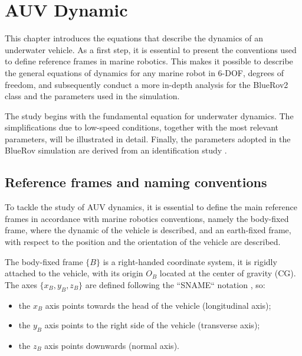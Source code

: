 \chapter{AUV Dynamic}
\label{chap:second}
\ifpdf
    \graphicspath{{Chapter2/Figures/PNG/}{Chapter2/Figures/PDF/}{Chapter2/Figures/}{Chapter2/Figures/EPS/}}
\else
    \graphicspath{{Chapter2/Figures/EPS/}{Chapter2/Figures/}}
\fi
This chapter introduces the equations that describe the dynamics of an underwater vehicle. As a first step, it is essential to present 
the conventions used to define reference frames in marine robotics. This makes it possible to describe the general equations of dynamics 
\cite{fossenHandbookMarineCraft2011} for any marine robot in 6-DOF, degrees of freedom, and subsequently conduct a more in-depth analysis 
for the BlueRov2 class and the parameters used in the simulation.

The study begins with the fundamental equation for underwater dynamics. The simplifications due to low-speed conditions, together with the most relevant 
parameters, will be illustrated in detail.
Finally, the parameters adopted in the BlueRov simulation are derived from an identification study \cite{bergDevelopmentCommissioningDP2012}.

\section{Reference frames and naming conventions}
To tackle the study of AUV dynamics, it is essential to define the main reference frames in accordance with marine robotics conventions, namely 
the body-fixed frame, where the dynamic of the vehicle is described, and an earth-fixed frame, with respect to the position and the orientation 
of the vehicle are described.

The body-fixed frame $\{B\}$ is a right-handed coordinate system, it is rigidly attached to the vehicle, with its origin $O_B$ located at the 
center of gravity (CG). The axes $\{x_B , y_B , z_B\}$ are defined following the ``SNAME`` notation
 \cite{thesocietyofnavalarchitectsandmarineengineerssnameNomenclatureTreatingMotion1950}, so:
 \begin{itemize}
    \item the $x_B$ axis points towards the head of the vehicle (longitudinal axis);
    \item the $y_B$ axis points to the right side of the vehicle (transverse axis);
    \item the $z_B$ axis points downwards (normal axis).
 \end{itemize}

